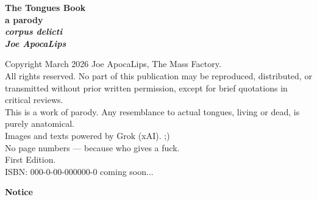 \documentclass[10pt,oneside,openany]{book}
\begin{document}
\pagecolor{white}
\color{black}

\thispagestyle{empty}
\raggedright
  \vspace*{\fill}
  \Huge\bfseries The Tongues Book \\
  \vspace{0.8em}
  \Large a parody \\
  \vspace{0.5em}
  \normalsize\itshape corpus delicti \\
  \vspace{3em}
  \large Joe ApocaLips \\
  \vspace*{\fill}
\newpage

\thispagestyle{empty}
\raggedright
\vspace*{\fill}
  \small
  \textcopyright{} Copyright March 2026 Joe ApocaLips, The Mass Factory. \\
  \vspace{1em}
  All rights reserved. No part of this publication may be reproduced,
  distributed, or transmitted without prior written permission,
  except for brief quotations in critical reviews. \\
  \vspace{1em}
  This is a work of parody. Any resemblance to actual tongues,
  living or dead, is purely anatomical. \\
  \vspace{1em}
  Images and texts powered by Grok (xAI). ;) \\
  \vspace{1em}
  No page numbers — because who gives a fuck. \\
  \vspace{2em}
  First Edition. \\
  \vspace{1em}
  ISBN: 000-0-00-000000-0  coming soon...
\newpage

\thispagestyle{empty}
\raggedright
\vspace*{\fill}
  {\huge\bfseries Notice} \\
  \vspace{1.8em}
\end{document}
